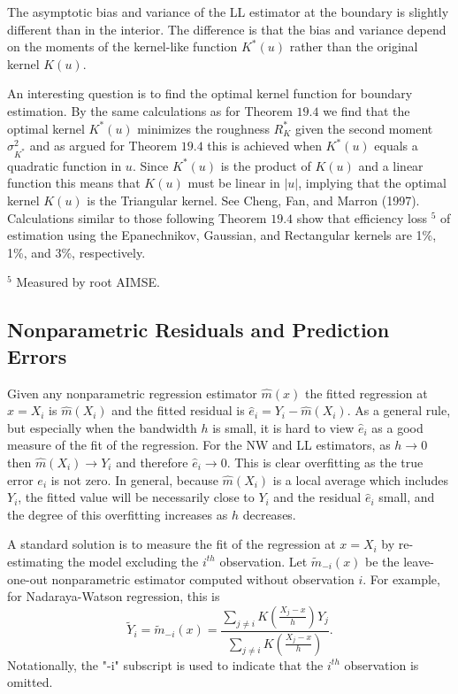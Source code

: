 \documentclass[10pt]{article}
\begin{document}
The asymptotic bias and variance of the LL estimator at the boundary is slightly different than in the interior. The difference is that the bias and variance depend on the moments of the kernel-like function $K^{*}(u)$ rather than the original kernel $K(u)$.

An interesting question is to find the optimal kernel function for boundary estimation. By the same calculations as for Theorem $19.4$ we find that the optimal kernel $K^{*}(u)$ minimizes the roughness $R_{K}^{*}$ given the second moment $\sigma_{K^{*}}^{2}$ and as argued for Theorem $19.4$ this is achieved when $K^{*}(u)$ equals a quadratic function in $u$. Since $K^{*}(u)$ is the product of $K(u)$ and a linear function this means that $K(u)$ must be linear in $|u|$, implying that the optimal kernel $K(u)$ is the Triangular kernel. See Cheng, Fan, and Marron (1997). Calculations similar to those following Theorem $19.4$ show that efficiency loss ${ }^{5}$ of estimation using the Epanechnikov, Gaussian, and Rectangular kernels are 1\%, 1\%, and 3\%, respectively.

${ }^{5}$ Measured by root AIMSE.

\subsection{Nonparametric Residuals and Prediction Errors}
Given any nonparametric regression estimator $\widehat{m}(x)$ the fitted regression at $x=X_{i}$ is $\widehat{m}\left(X_{i}\right)$ and the fitted residual is $\widehat{e}_{i}=Y_{i}-\widehat{m}\left(X_{i}\right)$. As a general rule, but especially when the bandwidth $h$ is small, it is hard to view $\widehat{e}_{i}$ as a good measure of the fit of the regression. For the NW and LL estimators, as $h \rightarrow 0$ then $\widehat{m}\left(X_{i}\right) \rightarrow Y_{i}$ and therefore $\widehat{e}_{i} \rightarrow 0$. This is clear overfitting as the true error $e_{i}$ is not zero. In general, because $\widehat{m}\left(X_{i}\right)$ is a local average which includes $Y_{i}$, the fitted value will be necessarily close to $Y_{i}$ and the residual $\widehat{e}_{i}$ small, and the degree of this overfitting increases as $h$ decreases.

A standard solution is to measure the fit of the regression at $x=X_{i}$ by re-estimating the model excluding the $i^{t h}$ observation. Let $\widetilde{m}_{-i}(x)$ be the leave-one-out nonparametric estimator computed without observation $i$. For example, for Nadaraya-Watson regression, this is
$$
\widetilde{Y}_{i}=\widetilde{m}_{-i}(x)=\frac{\sum_{j \neq i} K\left(\frac{X_{j}-x}{h}\right) Y_{j}}{\sum_{j \neq i} K\left(\frac{X_{j}-x}{h}\right)} .
$$
Notationally, the "-i" subscript is used to indicate that the $i^{t h}$ observation is omitted.
\end{document}
